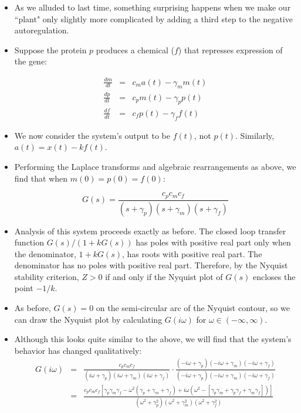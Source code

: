 \documentclass{article}
\begin{document}
\begin{itemize}

\item As we alluded to last time, something surprising happens when we make our ``plant" only slightly more complicated by adding a third step to the negative autoregulation.

\item Suppose the protein $p$ produces a chemical ($f$) that represses expression of the gene:

\begin{eqnarray*}
\frac{dm}{dt} & = & c_m a(t) - \gamma_m m(t)\\
\frac{dp}{dt} & = & c_p m(t) - \gamma_p p(t)\\
\frac{df}{dt} & = & c_f p(t) - \gamma_f f(t)
\end{eqnarray*}

\item We now consider the system's output to be $f(t)$, not $p(t)$. Similarly, $a(t) = x(t) - k f(t)$.

\item Performing the Laplace transforms and algebraic rearrangements as above, we find that when $m(0)=p(0)=f(0)$:

\[ G(s) = \frac{c_p c_m c_f}{\left( s + \gamma_p \right)\left( s + \gamma_m \right)\left( s + \gamma_f \right)} \]

\item Analysis of this system proceeds exactly as before. The closed loop transfer function $G(s)/(1+kG(s))$ has poles with positive real part only when the denominator, $1+kG(s)$, has roots with positive real part. The denominator has no poles with positive real part. Therefore, by the Nyquist stability criterion, $Z>0$ if and only if the Nyquist plot of $G(s)$ encloses the point $-1/k$.

\item As before, $G(s)=0$ on the semi-circular arc of the Nyquist contour, so we can draw the Nyquist plot by calculating $G(i \omega)$ for $\omega \in (-\infty, \infty)$.

\item Although this looks quite similar to the above, we will find that the system's behavior has changed qualitatively:
\begin{eqnarray*}
G(i \omega) & = &  \frac{c_p c_m c_f}{\left( i\omega + \gamma_p \right)\left( i\omega + \gamma_m \right)\left( i\omega + \gamma_f \right)} \cdot \frac{\left(- i\omega + \gamma_p \right)\left( - i\omega + \gamma_m \right)\left( -i\omega + \gamma_f \right)}{\left(- i\omega + \gamma_p \right)\left(- i\omega + \gamma_m \right)\left( -i\omega + \gamma_f \right)}\\
& = & \frac{c_p c_m c_f \left[ \gamma_p \gamma_m \gamma_f - \omega^2 \left(\gamma_p + \gamma_m + \gamma_f \right) + i \omega \left( \omega^2 - \left[ \gamma_p \gamma_m + \gamma_p \gamma_f + \gamma_m \gamma_f \right] \right) \right]}{\left( \omega^2 + \gamma_p^2 \right)\left( \omega^2 + \gamma_m^2 \right)\left( \omega^2 + \gamma_f^2 \right)}
\end{eqnarray*}


\end{itemize}
\end{document}
